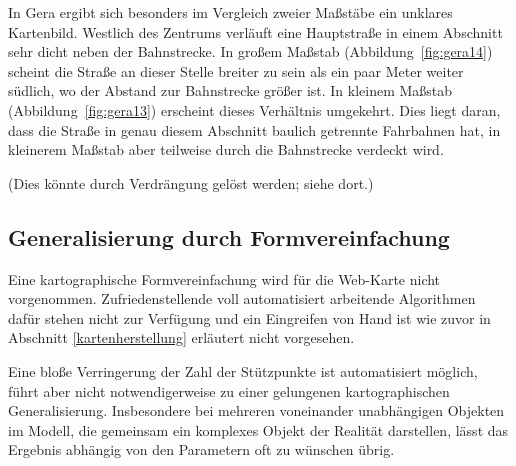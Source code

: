\documentclass[../main/thesis.tex]{subfiles}
\begin{document}
In Gera ergibt sich besonders im Vergleich zweier Maßstäbe ein unklares Kartenbild.
Westlich des Zentrums verläuft eine Hauptstraße in einem Abschnitt sehr dicht neben der Bahnstrecke.
In großem Maßstab (Abbildung~\ref{fig:gera14}) scheint die Straße an dieser Stelle breiter zu sein als ein paar Meter weiter südlich, wo der Abstand zur Bahnstrecke größer ist.
In kleinem Maßstab (Abbildung~\ref{fig:gera13}) erscheint dieses Verhältnis umgekehrt.
Dies liegt daran, dass die Straße in genau diesem Abschnitt baulich getrennte Fahrbahnen hat, in kleinerem Maßstab aber teilweise durch die Bahnstrecke verdeckt wird.

(Dies könnte durch Verdrängung gelöst werden; siehe dort.)




\subsection{Generalisierung durch Formvereinfachung}


Eine kartographische Formvereinfachung wird für die Web-Karte nicht vorgenommen.
Zufriedenstellende voll automatisiert arbeitende Algorithmen dafür stehen nicht zur Verfügung und ein Eingreifen von Hand ist wie zuvor in Abschnitt \ref{kartenherstellung} erläutert nicht vorgesehen.

Eine bloße Verringerung der Zahl der Stützpunkte ist automatisiert möglich, führt aber nicht notwendigerweise zu einer gelungenen kartographischen Generalisierung.
Insbesondere bei mehreren voneinander unabhängigen Objekten im Modell, die gemeinsam ein komplexes Objekt der Realität darstellen, lässt das Ergebnis abhängig von den Parametern oft zu wünschen übrig.


\end{document}
